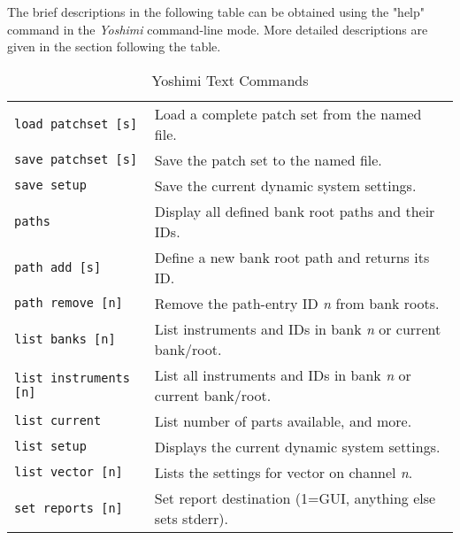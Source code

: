    The brief descriptions in the following table can be obtained
   using the "help" command in the \textsl{Yoshimi} command-line mode.
   More detailed descriptions are given in the section following the table.

   \begin{table}[H]
      \centering
      \caption{Yoshimi Text Commands}
      \label{table:yoshimi_text_commands}
      \begin{tabular}{l l}

         \texttt{load patchset [s]} &
            Load a complete patch set from the named file. \\

         \texttt{save patchset [s]} &
            Save the patch set to the named file. \\

         \texttt{save setup} &
            Save the current dynamic system settings. \\

         \texttt{paths} &
            Display all defined bank root paths and their IDs. \\

         \texttt{path add [s]} &
            Define a new bank root path and returns its ID. \\

         \texttt{path remove [n]} &
            Remove the path-entry ID \textsl{n} from bank roots. \\

         \texttt{list banks [n]} &
            List instruments and IDs in bank \textsl{n} or
            current bank/root. \\

         \texttt{list instruments [n]} &
            List all instruments and IDs in bank \textsl{n}
            or current bank/root. \\

         \texttt{list current} &
            List number of parts available, and more. \\

         \texttt{list setup} &
            Displays the current dynamic system settings. \\

         \texttt{list vector [n]} &
            Lists the settings for vector on channel \textsl{n}. \\

         \texttt{set reports [n]} &
            Set report destination (1=GUI, anything else sets stderr). \\


\end{tabular}
\end{table}
